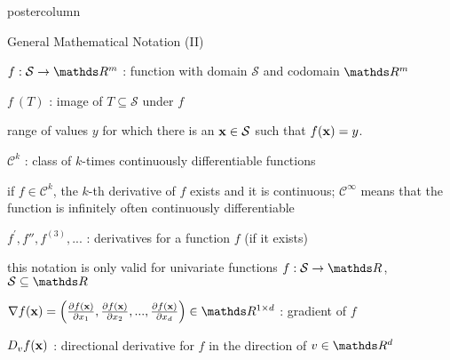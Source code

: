 \documentclass[11pt,compress,t,notes=noshow, xcolor=table]{beamer}
\begin{document}
\begin{frame}[fragile]{}
\begin{columns}
\begin{column}{.31\textwidth}
\begin{beamercolorbox}[center]{postercolumn}
\begin{minipage}{.98\textwidth}
{						\begin{myblock}{General Mathematical Notation (II)}
						\begin{codebox}
							 $f: \mathcal{S} \to \R^m$ : function with domain $\mathcal{S}$ and codomain $\R^m$
						\end{codebox}
						\hspace*{1ex}  %
						\begin{codebox}
							 $f~(T)$ : image of $T \subseteq \mathcal{S}$ under $f$
						\end{codebox}
						\hspace*{1ex} range of values $y$ for which there is an $\mathbf{x} \in \mathcal{S}$ such that $f(\mathbf{x}) = y$. \\
						\begin{codebox}
							 $\mathcal{C}^k$ : class of $k$-times continuously differentiable functions
						\end{codebox}
						\hspace*{1ex} if $f \in \mathcal{C}^k$, the $k$-th derivative of $f$ exists and it is continuous; $\mathcal{C}^\infty$ means that the function is infinitely often continuously differentiable \\
						\begin{codebox}
							 $f^\prime, f'', f^{(3)}, ...$ : derivatives for a function $f$ (if it exists)
						\end{codebox}
						\hspace*{1ex} this notation is only valid for univariate functions $f: \mathcal{S} \to \R$, $\mathcal{S} \subseteq \R$ \\
						\begin{codebox}
							 $\nabla f(\xv) = \left(\frac{\partial f(\xv)}{\partial x_1}, \frac{\partial f(\xv)}{\partial x_2}, ..., \frac{\partial f(\xv)}{\partial x_d}\right) \in \R^{1 \times d}$ : gradient of $f$
						\end{codebox}
						\hspace*{1ex} %
						\begin{codebox}
							 $D_v f(\mathbf{x})$ : directional derivative for $f$ in the direction of $v \in \R^d$
						\end{codebox}
						\hspace*{1ex} %

\end{myblock}}
\end{minipage}
\end{beamercolorbox}
\end{column}
\end{columns}
\end{frame}
\end{document}
